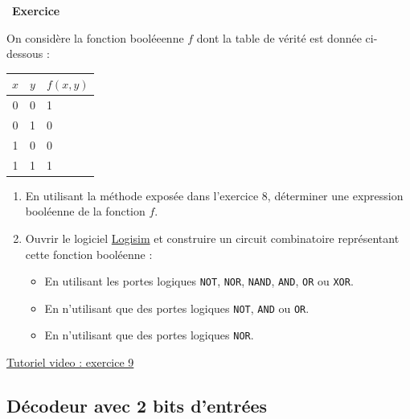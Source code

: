 \documentclass[
  11pt,
]{article}
\newcommand{\passthrough}[1]{#1}
\providecommand{\tightlist}{%
  \setlength{\itemsep}{0pt}\setlength{\parskip}{0pt}}
\newcounter{exo}
\newenvironment{exercice}[1]
{\par \medskip   \addtocounter{exo}{1} \noindent  
\begin{bclogo}[arrondi =0.1,   noborder = true, logo=\bccrayon, marge=4]{~\textbf{Exercice} \textbf{\theexo} {\itshape #1} }  \par}
{
\end{bclogo}
 \par \bigskip }
\newcounter{def}
\newcounter{logi}
\begin{document}
\begin{exercice}{}

On considère la fonction booléeenne \(f\) dont la table de vérité est
donnée ci-dessous :

\begin{longtable}[]{@{}cll@{}}
\toprule
\(x\) & \(y\) & \(f(x, y)\)\tabularnewline
\midrule
\endhead
0 & 0 & 1\tabularnewline
0 & 1 & 0\tabularnewline
1 & 0 & 0\tabularnewline
1 & 1 & 1\tabularnewline
\bottomrule
\end{longtable}

\begin{enumerate}
\def\labelenumi{\arabic{enumi}.}
\item
  En utilisant la méthode exposée dans l'exercice 8, déterminer une
  expression booléenne de la fonction \(f\).
\item
  Ouvrir le logiciel \href{http://www.cburch.com/logisim/}{Logisim} et
  construire un circuit combinatoire représentant cette fonction
  booléenne :

  \begin{itemize}
  \tightlist
  \item
    En utilisant les portes logiques \passthrough{\lstinline!NOT!},
    \passthrough{\lstinline!NOR!}, \passthrough{\lstinline!NAND!},
    \passthrough{\lstinline!AND!}, \passthrough{\lstinline!OR!} ou
    \passthrough{\lstinline!XOR!}.
  \item
    En n'utilisant que des portes logiques
    \passthrough{\lstinline!NOT!}, \passthrough{\lstinline!AND!} ou
    \passthrough{\lstinline!OR!}.
  \item
    En n'utilisant que des portes logiques
    \passthrough{\lstinline!NOR!}.
  \end{itemize}
\end{enumerate}

\href{videos/exercice9.mp4}{Tutoriel video : exercice 9}

\end{exercice}

\hypertarget{duxe9codeur-avec-2-bits-dentruxe9es}{%
\subsection{Décodeur avec 2 bits
d'entrées}\label{duxe9codeur-avec-2-bits-dentruxe9es}}
\end{document}
